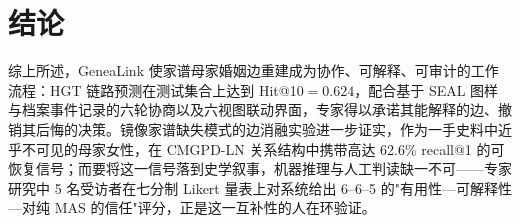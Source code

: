 \section{结论}\label{sec:conclusion-final}

综上所述，GeneaLink 使家谱母家婚姻边重建成为协作、可解释、可审计的工作流程：HGT 链路预测在测试集合上达到 Hit@10$=0.624$，配合基于 SEAL 图样与档案事件记录的六轮协商以及六视图联动界面，专家得以承诺其能解释的边、撤销其后悔的决策。镜像家谱缺失模式的边消融实验进一步证实，作为一手史料中近乎不可见的母家女性，在 CMGPD-LN 关系结构中携带高达 62.6\% recall@1 的可恢复信号；而要将这一信号落到史学叙事，机器推理与人工判读缺一不可——专家研究中 5 名受访者在七分制 Likert 量表上对系统给出 6--6--5 的"有用性—可解释性—对纯 MAS 的信任"评分，正是这一互补性的人在环验证。
